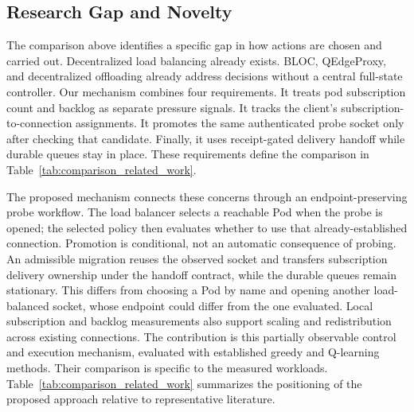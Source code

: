 \documentclass[manuscript]{acmart}
\begin{document}
\subsection{Research Gap and Novelty}

The comparison above identifies a specific gap in how actions are chosen and
carried out. Decentralized load balancing already exists. BLOC, QEdgeProxy, and
decentralized offloading already address decisions without a central
full-state controller. Our mechanism combines four requirements. It treats
pod subscription count and backlog as separate pressure signals. It tracks
the client's subscription-to-connection assignments. It promotes the same
authenticated probe socket only after checking that candidate. Finally, it
uses receipt-gated delivery handoff while durable queues stay in place.
These requirements
define the comparison in Table~\ref{tab:comparison_related_work}.

The proposed mechanism connects these concerns through an endpoint-preserving
probe workflow. The load balancer selects a reachable Pod when the probe is
opened; the selected policy then evaluates whether to use that already-established connection.
Promotion is conditional, not an automatic consequence of probing. An
admissible migration reuses the observed socket and transfers subscription
delivery ownership under the handoff contract, while the durable queues remain
stationary. This differs from choosing a Pod by name and opening another
load-balanced socket, whose endpoint could differ from the one evaluated.
Local subscription and backlog measurements also support scaling and
redistribution across existing connections. The contribution is this
partially observable control and execution mechanism, evaluated with established
greedy and Q-learning methods. Their comparison is specific to the measured workloads.
Table~\ref{tab:comparison_related_work} summarizes the
positioning of the proposed approach relative to representative literature.
\end{document}
